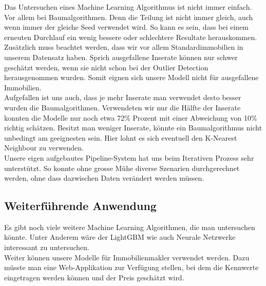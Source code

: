 Das Untersuchen eines Machine Learning Algorithmus ist nicht immer einfach. Vor allem bei Baumalgorithmen. Denn die Teilung ist nicht immer gleich, auch wenn immer der gleiche Seed verwendet wird. So kann es sein, dass bei einem erneuten Durchlauf ein wenig bessere oder schlechtere Resultate herauskommen.\\
Zusätzlich muss beachtet werden, dass wir vor allem Standardimmobilien in unserem Datensatz haben. Sprich ausgefallene Inserate können nur schwer geschätzt werden, wenn sie nicht schon bei der Outlier Detection herausgenommen wurden. Somit eignen sich unsere Modell nicht für ausgefallene Immobilien.\\[2ex]
%
Aufgefallen ist uns auch, dass je mehr Inserate man verwendet desto besser wurden die Baumalgorithmen. Verwendeten wir nur die Hälfte der Inserate konnten die Modelle nur noch etwa 72\% Prozent mit einer Abweichung von 10\% richtig schätzen. Besitzt man weniger Inserate, könnte ein Baumalgorithmus nicht unbedingt am geeignesten sein. Hier lohnt es sich eventuell den K-Nearest Neighbour zu verwenden.
\\[2ex]
%
Unsere eigen aufgebautes Pipeline-System hat uns beim Iterativen Prozess sehr unterstützt. So konnte ohne grosse Mühe diverse Szenarien durchgerechnet werden, ohne dass dazwischen Daten verändert werden müssen.
%	
\subsection{Weiterführende Anwendung} 
Es gibt noch viele weitere Machine Learning Algorithmen, die man untersuchen könnte. Unter Anderem wäre der LightGBM wie auch Neurale Netzwerke interessant zu untersuchen.\\ 
Weiter können unsere Modelle für Immobilienmakler verwendet werden. Dazu müsste man eine Web-Applikation zur Verfügung stellen, bei dem die Kennwerte eingetragen werden können und der Preis geschätzt wird. 


